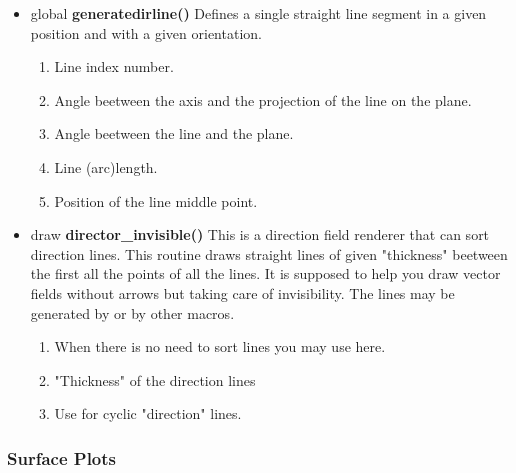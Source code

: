 \begin{itemize}
\item global {\bfseries generatedirline()} Defines a single
straight line segment in a given position and with a
given orientation.
\begin{enumerate}
\item {} Line index number.
\item {} Angle beetween the 
axis and the projection of the line on the
 plane.
\item {} Angle beetween the line
and the  plane.
\item {} Line (arc)length.
\item {} Position of the line middle
point.
\end{enumerate}
\item draw {\bfseries director\_invisible()} This is a
direction field renderer that can sort direction
lines. This routine
draws straight lines of given "thickness" beetween the
first all the points
of all the  lines. It is supposed to
help you draw vector fields
without arrows but taking care of invisibility.
The lines may be
generated by  or by other macros.
\begin{enumerate}
\item {} When there is no need to sort
lines you may use  here.
\item {} "Thickness" of the
direction lines
\item {} Use  for cyclic
"direction" lines.
\end{enumerate}
\end{itemize}


\subsubsection{Surface Plots}

